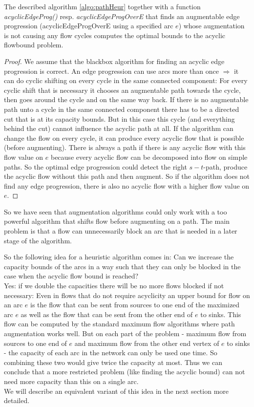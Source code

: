 \begin{prop}
 The described algorithm \ref{algo:pathHeur} together with a function \textit{acyclicEdgeProg()} 
 resp. \textit{acyclicEdgeProgOverE} 
 that finds an augmentable edge progression (acyclicEdgeProgOverE using a specified arc $e$)
 whose augmentation is not causing any flow cycles computes the optimal bounds to the acyclic flowbound problem. 
\end{prop}
\begin{proof}
 We assume that the blackbox algorithm for finding an acyclic edge progression is correct. An edge progression can use
 arcs more than once $\Rightarrow$ it can do cyclic shifting on every cycle in the same connected component: 
 For every cyclic shift that is necessary it chooses an augmentable path towards the cycle, then goes around the cycle 
 and on the same way back. If there is no augmentable path unto a cycle in the same connected component there has to be
 a directed cut that is at its capacity bounds. But in this case this cycle (and everything behind the cut) cannot 
 influence the acyclic path at all.
 If the algorithm can change the flow on every cycle, it can produce every acyclic flow that is possible (before augmenting).
 There is always a path if there is any acyclic flow with this flow value on $e$ because every acyclic flow can be 
 decomposed into flow on simple paths. So the optimal edge progression could detect the right $s-t$-path, produce the 
 acyclic flow without this path and then augment. So if the algorithm does not find any edge progression, there 
 is also no acyclic flow with a higher flow value on $e$.  
\end{proof}

So we have seen that augmentation algorithms could only work with a too powerful algorithm that shifts flow before 
augmenting on a path. The main problem is that a flow can unnecessarily block an arc that is needed in a later stage 
of the algorithm. 

So the following idea for a heuristic algorithm comes in: Can we increase the capacity bounds of the arcs in a way 
such that they can only be blocked in the case when the acyclic flow bound is reached?\\

Yes: if we double the capacities there will be no more flows blocked if not necessary: Even in flows that do not 
require acyclicity an upper bound for flow on an arc $e$ is the flow that can be sent from sources to one end of the 
maximized arc $e$ as well as the flow that can be sent from the other end of $e$ to sinks. This flow can be computed by 
the standard maximum flow algorithms where path augmentation works well. But on each part of the problem - maximum flow 
from sources to one end of $e$ and maximum flow from the other end vertex of $e$ to sinks - the capacity of each arc in 
the network can only be used one time. So combining these two would give twice the capacity at most. Thus we can 
conclude that a more restricted problem (like finding the acyclic bound) can not need more capacity than this on a 
single arc.\\

We will describe an equivalent variant of this idea in the next section more detailed.


